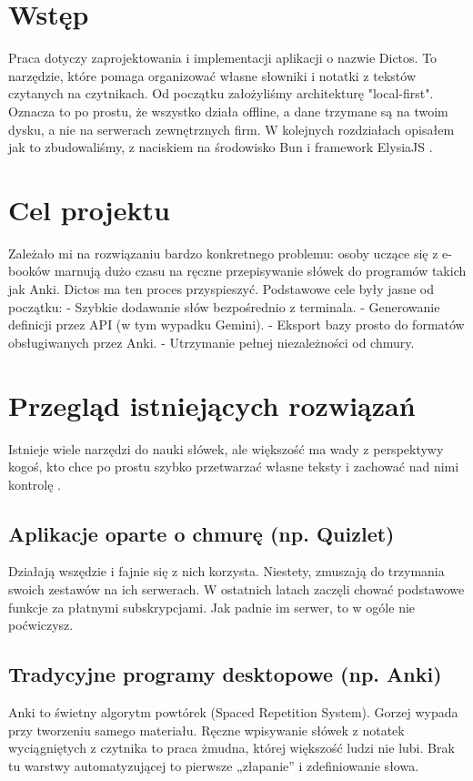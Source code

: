 \documentclass[times]{san}
\begin{document}
\maketitlepage
\spistresci

\section{Wstęp}

Praca dotyczy zaprojektowania i implementacji aplikacji o nazwie Dictos. To narzędzie, które pomaga organizować własne słowniki i notatki z tekstów czytanych na czytnikach. Od początku założyliśmy architekturę "local-first". Oznacza to po prostu, że wszystko działa offline, a dane trzymane są na twoim dysku, a nie na serwerach zewnętrznych firm. W kolejnych rozdziałach opisałem jak to zbudowaliśmy, z naciskiem na środowisko Bun i framework ElysiaJS \cite{knuth1984}.

\section{Cel projektu}

Zależało mi na rozwiązaniu bardzo konkretnego problemu: osoby uczące się z e-booków marnują dużo czasu na ręczne przepisywanie słówek do programów takich jak Anki. Dictos ma ten proces przyspieszyć. Podstawowe cele były jasne od początku:
- Szybkie dodawanie słów bezpośrednio z terminala.
- Generowanie definicji przez API (w tym wypadku Gemini).
- Eksport bazy prosto do formatów obsługiwanych przez Anki.
- Utrzymanie pełnej niezależności od chmury.

\section{Przegląd istniejących rozwiązań}

Istnieje wiele narzędzi do nauki słówek, ale większość ma wady z perspektywy kogoś, kto chce po prostu szybko przetwarzać własne teksty i zachować nad nimi kontrolę \cite{website_example}.

\subsection{Aplikacje oparte o chmurę (np. Quizlet)}
Działają wszędzie i fajnie się z nich korzysta. Niestety, zmuszają do trzymania swoich zestawów na ich serwerach. W ostatnich latach zaczęli chować podstawowe funkcje za płatnymi subskrypcjami. Jak padnie im serwer, to w ogóle nie poćwiczysz.

\subsection{Tradycyjne programy desktopowe (np. Anki)}
Anki to świetny algorytm powtórek (Spaced Repetition System). Gorzej wypada przy tworzeniu samego materiału. Ręczne wpisywanie słówek z notatek wyciągniętych z czytnika to praca żmudna, której większość ludzi nie lubi. Brak tu warstwy automatyzującej to pierwsze „złapanie” i zdefiniowanie słowa.
\end{document}

